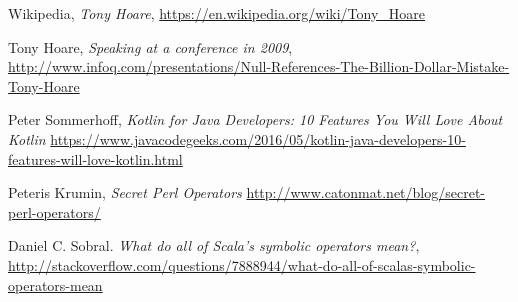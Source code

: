 \documentclass[a4paper,12pt]{article}
\begin{document}
\begin{thebibliography}{56}

	Wikipedia,
	\emph{Tony Hoare},
	\url{https://en.wikipedia.org/wiki/Tony_Hoare}
	
	Tony Hoare,
	\emph{Speaking at a conference in 2009},
	\url{http://www.infoq.com/presentations/Null-References-The-Billion-Dollar-Mistake-Tony-Hoare}
	
 	Peter Sommerhoff,
 	\emph{Kotlin for Java Developers: 10 Features You Will Love About Kotlin}
 	\url{https://www.javacodegeeks.com/2016/05/kotlin-java-developers-10-features-will-love-kotlin.html}

	Peteris Krumin,
	\emph{Secret Perl Operators}
	\url{http://www.catonmat.net/blog/secret-perl-operators/}

	Daniel C. Sobral.
	\emph{What do all of Scala's symbolic operators mean?},
	\url{http://stackoverflow.com/questions/7888944/what-do-all-of-scalas-symbolic-operators-mean}

\end{thebibliography}
\end{document}
